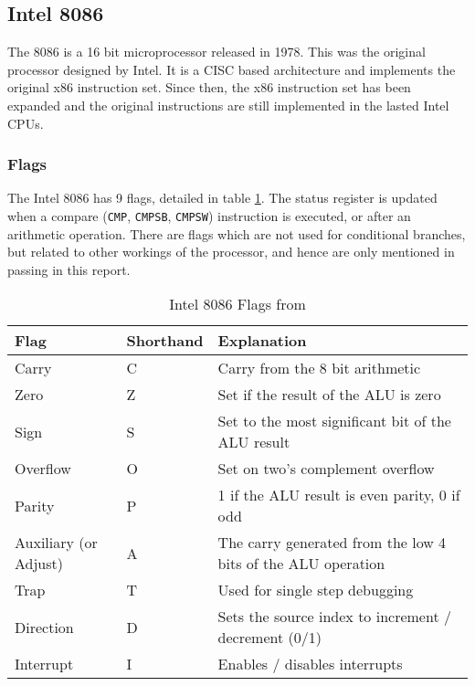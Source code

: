 \documentclass[12pt,a4paper]{article}
\begin{document}
\begin{bibunit}[is-unsrt]
\subsection{Intel 8086}

The 8086 is a 16 bit microprocessor released in 1978.
This was the original processor designed by Intel.
It is a CISC based architecture and implements the original x86 instruction set.
Since then, the x86 instruction set has been expanded and the original instructions are still implemented in the lasted Intel CPUs.

\subsubsection{Flags}

The Intel 8086 has 9 flags, detailed in table \ref{tab:Intel:flags}.
The status register is updated when a compare (\texttt{CMP}, \texttt{CMPSB}, \texttt{CMPSW}) instruction is executed, or after an arithmetic operation.
There are flags which are not used for conditional branches, but related to other workings of the processor, and hence are only mentioned in passing in this report.
%  

\begin{table}
\centering
\caption{Intel 8086 Flags from \cite{Intel:flags}}
\label{tab:Intel:flags}
\begin{tabular}{p{}p{}p{}}\hline
Flag & Shorthand & Explanation \\ \hline
Carry & C & Carry from the 8 bit arithmetic \\
Zero & Z & Set if the result of the ALU is zero \\
Sign & S & Set to the most significant bit of the ALU result \\
Overflow & O & Set on two's complement overflow \\
Parity & P & 1 if the ALU result is even parity, 0 if odd \cite{flag:p} \\
Auxiliary (or Adjust) & A & The carry generated from the low 4 bits of the ALU operation \cite{flag:a}\\
Trap & T & Used for single step debugging \cite{flag:t} \\
Direction & D & Sets the source index to increment / decrement (0/1) \cite{flag:d} \\
Interrupt & I & Enables / disables interrupts \cite{flag:i} \\
\end{tabular}
\end{table}
%  


\end{bibunit}
\end{document}
